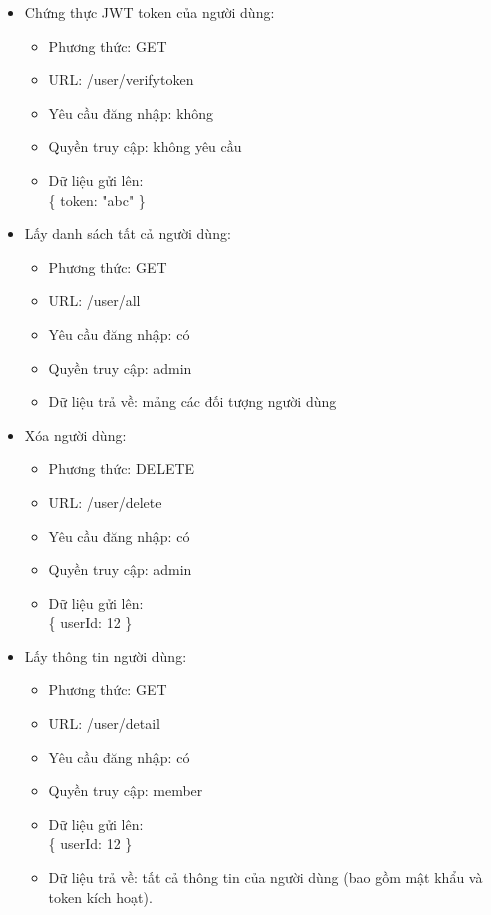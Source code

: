 \documentclass[a4paper,12pt,oneside]{article}
\begin{document}
\begin{itemize}
\begin{itemize}
\item Chứng thực JWT token của người dùng:
	\begin{itemize}
	\item Phương thức: GET
	\item URL: /user/verifytoken
	\item Yêu cầu đăng nhập: không
	\item Quyền truy cập: không yêu cầu
	\item Dữ liệu gửi lên:\\ 
		\{
  			token: "abc"
		\}
	\end{itemize}

\item Lấy danh sách tất cả người dùng:
	\begin{itemize}
	\item Phương thức: GET
	\item URL: /user/all
	\item Yêu cầu đăng nhập: có
	\item Quyền truy cập: admin
	\item Dữ liệu trả về: mảng các đối tượng người dùng
	\end{itemize}

\item Xóa người dùng:
	\begin{itemize}
	\item Phương thức: DELETE
	\item URL: /user/delete
	\item Yêu cầu đăng nhập: có
	\item Quyền truy cập: admin
	\item Dữ liệu gửi lên:\\ 
		\{
  			userId: 12
		\}
	\end{itemize}

\item Lấy thông tin người dùng:
	\begin{itemize}
	\item Phương thức: GET
	\item URL: /user/detail
	\item Yêu cầu đăng nhập: có
	\item Quyền truy cập: member
	\item Dữ liệu gửi lên:\\ 
		\{
  			userId: 12
		\}
	\item Dữ liệu trả về: tất cả thông tin của người dùng (bao gồm mật khẩu và token kích hoạt).
	\end{itemize}


\end{itemize}
\end{itemize}
\end{document}
